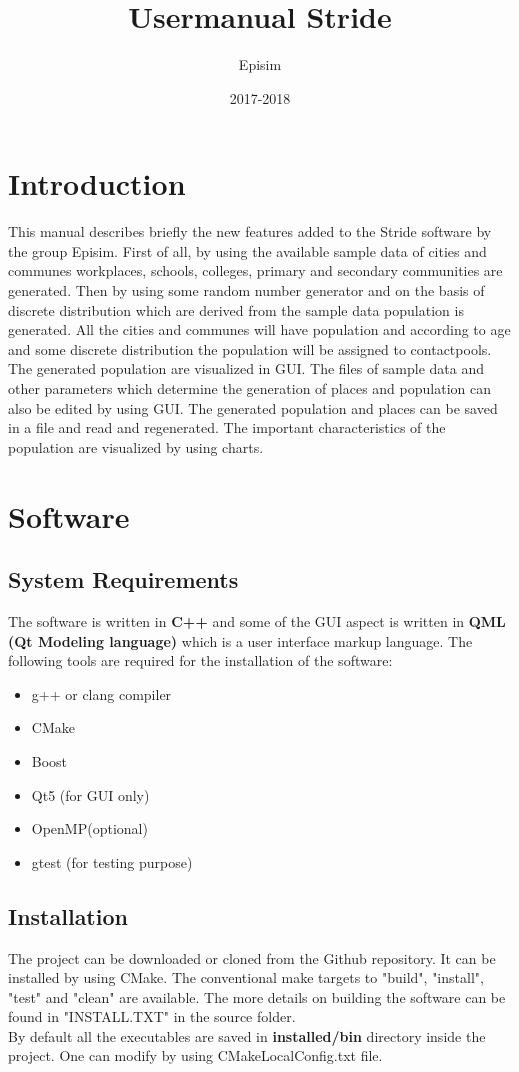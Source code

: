 \documentclass[a4paper]{article}
\title{Usermanual Stride}
\author{Episim}
\date{2017-2018}
\begin{document}
\maketitle

\newpage

\section*{Introduction}

This manual describes briefly the new features added to the Stride software by the group Episim. First of all, by using the available sample data of cities and 
communes workplaces, schools, colleges, primary and secondary communities are generated. Then by using some random number generator and on the basis of discrete distribution which are derived from the sample data population is generated. All the cities and communes will have population and according to age and some discrete distribution the population will be assigned to contactpools. The generated population are visualized in GUI. The files of sample data and other parameters which determine the generation of places and population can also be edited by using GUI. The generated population and places can be saved in a file and read and regenerated. The important characteristics of the population are visualized by using charts. \\

\section{Software}
\subsection{System Requirements}
The software is written in \textbf{C++} and some of the GUI aspect is written in \textbf{QML (Qt Modeling language)} which is a user interface markup language. The following tools are required for the installation of the software:
\begin{itemize}
	\item g++ or clang compiler
    \item CMake
    \item Boost
    \item Qt5 (for GUI only)
    \item OpenMP(optional)
    \item gtest (for testing purpose)
\end{itemize}
\subsection{Installation}
The project can be downloaded or cloned from the Github repository. It can be installed by using CMake. The conventional make targets to "build", "install", "test" and "clean" are available. The more details on building the software can be found in "INSTALL.TXT" in the source folder.\\
By default all the executables are saved in \textbf{installed/bin} directory inside the project. One can modify by using CMakeLocalConfig.txt file. 
\end{document}
